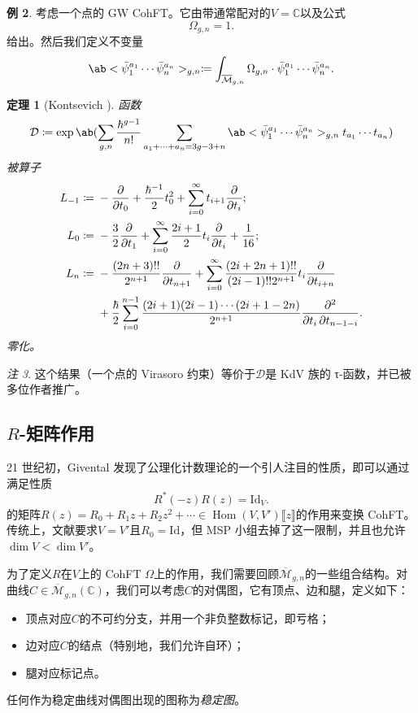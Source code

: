 \documentclass{amsart}
\newtheorem{thm}{定理}[section]
\theoremstyle{definition}
\newtheorem{exm}[thm]{例}
\theoremstyle{remark}
\newtheorem{rmk}[thm]{注}
\theoremstyle{plain}
\theoremstyle{definition}
\theoremstyle{remark}
\newcommand{\C}{\mathbb{C}}
\newcommand{\Mbar}{\overline{\mathcal{M}}}
\newcommand{\mc}[1]{\mathcal{#1}}
\newcommand{\mr}[1]{\mathrm{#1}}
\newcommand{\1}{\mathbf{1}}
\newcommand{\2}{\mathbf{2}}
\newcommand{\3}{\mathbf{3}}
\newcommand{\ps}[1]{\llbracket #1 \rrbracket}
\DeclareMathOperator{\Hom}{Hom}
\begin{document}
\begin{exm}
    考虑一个点的 GW CohFT。它由带通常配对的$V = \C$以及公式
    \[ \Omega_{g,n} = 1. \]
    给出。然后我们定义不变量
    \[ \ab<\bar{\psi}_1^{a_1} \cdots \bar{\psi}_n^{a_n}>_{g,n} \coloneqq \int_{\Mbar_{g,n}} \Omega_{g,n} \cdot \bar{\psi}_1^{a_1} \cdots \bar{\psi}_n^{a_n}. \]
    \begin{thm}[Kontsevich {\cite{Kontsevich1992}}]
        函数
        \[ \mc{D} \coloneqq \exp \ab(\sum_{g,n} \frac{\hbar^{g-1}}{n!}\sum_{a_1 + \cdots + a_n = 3g-3+n} \ab<\bar{\psi}_1^{a_1} \cdots \bar{\psi}_n^{a_n}>_{g,n} t_{a_1}\cdots t_{a_n}) \]
        被算子
        \begin{align*}
            L_{-1} \coloneqq{}& -\pdv{}{t_0} + \frac{\hbar^{-1}}{2} t_0^2 + \sum_{i=0}^{\infty} t_{i+1} \pdv{}{t_i};\\
            L_0 \coloneqq{}& -\frac{3}{2} \pdv{}{t_1} + \sum_{i=0}^{\infty} \frac{2i+1}{2} t_i \pdv{}{t_i} + \frac{1}{16};\\
            L_n \coloneqq{}& -\frac{(2n+3)!!}{2^{n+1}} \pdv{}{t_{n+1}} + \sum_{i=0}^{\infty} \frac{(2i+2n+1)!!}{(2i-1)!! 2^{n+1}} t_i \pdv{}{t_{i+n}} \\
            &+ \frac{\hbar}{2} \sum_{i=0}^{n-1} \frac{(2i+1) (2i-1) \cdots (2i+1-2n)}{2^{n+1}} \pdv{}{t_i,t_{n-1-i}}.
        \end{align*}
        零化。
    \end{thm}
\end{exm}

\begin{rmk}
    这个结果（一个点的 Virasoro 约束）等价于$\mc{D}$是 KdV 族的 τ-函数，并已被多位作者推广。
\end{rmk}



\subsection{$R$-矩阵作用}%
\label{sub:R-matrix action}

21 世纪初，Givental 发现了公理化计数理论的一个引人注目的性质，即可以通过满足性质
\[ R^*(-z) R(z) = \mr{Id}_V. \]
的矩阵$R(z) = R_0 + R_1 z + R_2 z^2 + \cdots \in \Hom(V, V')\ps{z}$的作用来变换 CohFT。传统上，文献要求$V = V'$且$R_0 = \mr{Id}$，但 MSP 小组去掉了这一限制，并且也允许$\dim V < \dim V'$。

为了定义$R$在$V$上的 CohFT $\Omega$上的作用，我们需要回顾$\Mbar_{g,n}$的一些组合结构。对曲线$C\in \Mbar_{g,n}(\C)$，我们可以考虑$C$的对偶图，它有顶点、边和腿，定义如下：
\begin{itemize}
    \item 顶点对应$C$的不可约分支，并用一个非负整数标记，即亏格；
    \item 边对应$C$的结点（特别地，我们允许自环）；
    \item 腿对应标记点。
\end{itemize}
任何作为稳定曲线对偶图出现的图称为\textit{稳定图}。
\end{document}
